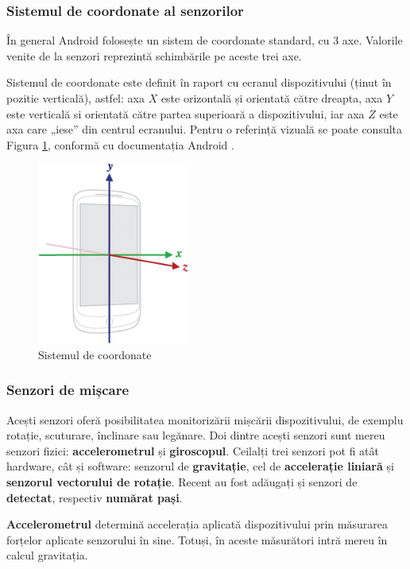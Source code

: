 \documentclass[12pt,a4paper]{article}
\begin{document}
\subsubsection{Sistemul de coordonate al senzorilor}
În general Android folosește un sistem de coordonate standard, cu 3 axe. Valorile venite de la senzori reprezintă schimbările pe aceste trei axe.

Sistemul de coordonate este definit în raport cu ecranul dispozitivului (ținut în pozitie verticală), astfel: axa $X$ este orizontală și orientată către dreapta, axa $Y$ este verticală si orientată către partea superioară a dispozitivului, iar axa $Z$ este axa care „iese” din centrul ecranului. Pentru o referință vizuală se poate consulta Figura \ref{fig:axis_device}, conformă cu documentația Android \cite{DeveloperAndroid}.

\begin{figure}[hbtp]
\centering
\includegraphics[width=5cm]{figures/axis_device.png}
\caption{Sistemul de coordonate}
\label{fig:axis_device}
\end{figure}


\subsubsection{Senzori de mișcare}
Acești senzori oferă posibilitatea monitorizării mișcării dispozitivului, de exemplu rotație, scuturare, înclinare sau legănare. Doi dintre acești senzori sunt mereu senzori fizici: \textbf{accelerometrul} și \textbf{giroscopul}. Ceilalți trei senzori pot fi atât hardware, cât și software: senzorul de \textbf{gravitație}, cel de \textbf{accelerație liniară} și \textbf{senzorul vectorului de rotație}. Recent au fost adăugați și senzori de \textbf{detectat}, respectiv \textbf{numărat pași}.

	\textbf{Accelerometrul} determină accelerația aplicată dispozitivului prin măsurarea forțelor aplicate senzorului în sine. Totuși, în aceste măsurători intră mereu în calcul gravitația.
\end{document}
